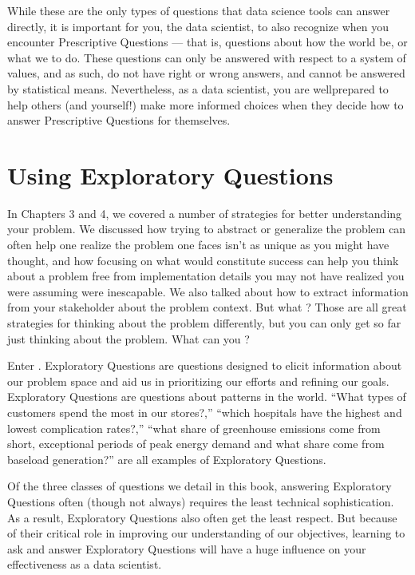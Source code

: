 \documentclass[letterpaper,10pt,english]{jupyterBook}
\begin{document}
\sphinxAtStartPar
While these are the only types of questions that data science tools can answer directly, it is important for you, the data scientist, to also recognize when you encounter Prescriptive Questions — that is, questions about how the world  be, or what we  to do. These questions can only be answered with respect to a system of values, and as such, do not have right or wrong answers, and cannot be answered by statistical means. Nevertheless, as a data scientist, you are well\sphinxhyphen{}prepared to help others (and yourself!) make more informed choices when they decide how to answer Prescriptive Questions for themselves.

\sphinxstepscope


\chapter{Using Exploratory Questions}
\label{\detokenize{30_questions/10_using_exploratory_questions:using-exploratory-questions}}\label{\detokenize{30_questions/10_using_exploratory_questions::doc}}
\sphinxAtStartPar
In Chapters 3 and 4, we covered a number of strategies for better understanding your problem. We discussed how trying to abstract or generalize the problem can often help one realize the problem one faces isn’t as unique as you might have thought, and how focusing on what would constitute success can help you think about a problem free from implementation details you may not have realized you were assuming were inescapable. We also talked about how to extract information from your stakeholder about the problem context. But what ? Those are all great strategies for thinking about the problem differently, but you can only get so far just thinking about the problem. What can you ?

\sphinxAtStartPar
Enter . Exploratory Questions are questions designed to elicit information about our problem space and aid us in prioritizing our efforts and refining our goals. Exploratory Questions are questions about patterns in the world. “What types of customers spend the most in our stores?,” “which hospitals have the highest and lowest complication rates?,” “what share of greenhouse emissions come from short, exceptional periods of peak energy demand and what share come from baseload generation?” are all examples of Exploratory Questions.

\sphinxAtStartPar
Of the three classes of questions we detail in this book, answering Exploratory Questions often (though not always) requires the least technical sophistication. As a result, Exploratory Questions also often get the least respect. But because of their critical role in improving our understanding of our objectives, learning to ask and answer Exploratory Questions will have a huge influence on your effectiveness as a data scientist.
\end{document}
